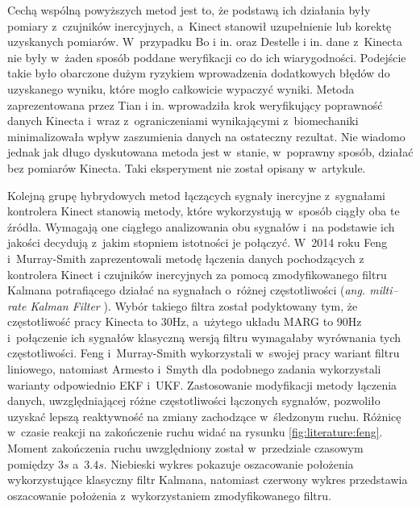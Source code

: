 Cechą wspólną powyższych metod jest to, że podstawą ich działania były pomiary z~czujników inercyjnych, a~Kinect stanowił uzupełnienie lub korektę uzyskanych pomiarów. W~przypadku Bo i in. oraz Destelle i in. dane z~Kinecta nie były w~żaden sposób poddane weryfikacji co do ich wiarygodności. Podejście takie było obarczone dużym ryzykiem wprowadzenia dodatkowych błędów do uzyskanego wyniku, które mogło całkowicie wypaczyć wyniki. Metoda zaprezentowana przez Tian i in. wprowadziła krok weryfikujący poprawność danych Kinecta i~wraz z~ograniczeniami wynikającymi z~biomechaniki minimalizowała wpływ zaszumienia danych na ostateczny rezultat. Nie wiadomo jednak jak długo dyskutowana metoda jest w~stanie, w~poprawny sposób, działać bez pomiarów Kinecta. Taki eksperyment nie został opisany w~artykule.

Kolejną grupę hybrydowych metod łączących sygnały inercyjne z~sygnałami kontrolera Kinect stanowią metody, które wykorzystują w~sposób ciągły oba te źródła. Wymagają one ciągłego analizowania obu sygnałów i~na podstawie ich jakości decydują z~jakim stopniem istotności je połączyć. W~2014 roku Feng i~Murray-Smith \cite{Murray-Smith2014} zaprezentowali metodę łączenia danych pochodzących z kontrolera Kinect i czujników inercyjnych za pomocą zmodyfikowanego filtru Kalmana potrafiącego działać na sygnałach o~różnej częstotliwości (\emph{ang. milti--rate Kalman Filter} \cite{Dhuli2009}). Wybór takiego filtra został podyktowany tym, że częstotliwość pracy Kinecta to 30Hz, a~użytego układu MARG to 90Hz i~połączenie ich sygnałów klasyczną wersją filtru wymagałaby wyrównania tych częstotliwości. Feng i~Murray-Smith wykorzystali w~swojej pracy wariant filtru liniowego, natomiast Armesto i~Smyth dla podobnego zadania wykorzystali warianty odpowiednio EKF\cite{Armesto01062007} i~UKF\cite{Smyth2007}. Zastosowanie modyfikacji metody łączenia danych, uwzględniającej różne częstotliwości łączonych sygnałów, pozwoliło uzyskać lepszą reaktywność na zmiany zachodzące w~śledzonym ruchu. Różnicę w~czasie reakcji na zakończenie ruchu widać na rysunku \ref{fig:literature:feng}. Moment zakończenia ruchu uwzględniony został w~przedziale czasowym pomiędzy $3s$ a~$3.4s$. Niebieski wykres pokazuje oszacowanie położenia wykorzystujące klasyczny filtr Kalmana, natomiast czerwony wykres przedstawia oszacowanie położenia z~wykorzystaniem zmodyfikowanego filtru.

